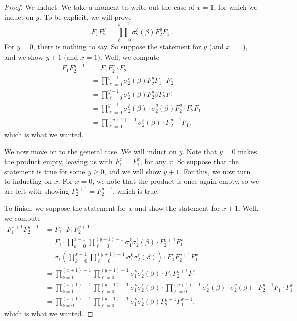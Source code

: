 \documentclass{article}
\numberwithin{equation}{section}
\begin{document}
\begin{proof}
	We induct. We take a moment to write out the case of $x=1$, for which we induct on $y$. To be explicit, we will prove
	\[F_1F_2^y=\prod_{\ell=0}^{y-1}\sigma_2^\ell(\beta)F_2^yF_1.\]
	For $y=0$, there is nothing to say. So suppose the statement for $y$ (and $x=1$), and we show $y+1$ (and $x=1$). Well, we compute
	\begin{align*}
		F_1F_2^{y+1} &= F_1F_2^y\cdot F_2 \\
		&= \prod_{\ell=0}^{y-1}\sigma_2^\ell(\beta)F_2^yF_1\cdot F_2 \\
		&= \prod_{\ell=0}^{y-1}\sigma_2^\ell(\beta)F_2^y\beta F_2F_1 \\
		&= \prod_{\ell=0}^{y-1}\sigma_2^\ell(\beta)\cdot \sigma_2^y(\beta)F_2^y\cdot F_2F_1 \\
		&= \prod_{\ell=0}^{(y+1)-1}\sigma_2^\ell(\beta)\cdot F_2^{y+1}F_1,
	\end{align*}
	which is what we wanted.
	
	We now move on to the general case. We will induct on $y$. Note that $y=0$ makes the product empty, leaving us with $F_1^x=F_1^x$, for any $x$. So suppose that the statement is true for some $y\ge0$, and we will show $y+1$. For this, we now turn to inducting on $x$. For $x=0$, we note that the product is once again empty, so we are left with showing $F_2^{y+1}=F_2^{y+1}$, which is true.
	
	To finish, we suppose the statement for $x$ and show the statement for $x+1$. Well, we compute
	\begin{align*}
		F_1^{x+1}F_2^{y+1} &= F_1\cdot F_1^xF_2^{y+1} \\
		&= F_1\cdot \prod_{k=0}^{x-1}\prod_{\ell=0}^{(y+1)-1}\sigma_1^k\sigma_2^\ell(\beta)\cdot F_2^{y+1}F_1^x \\
		&= \sigma_1\left(\prod_{k=0}^{x-1}\prod_{\ell=0}^{(y+1)-1}\sigma_1^k\sigma_2^\ell(\beta)\right)\cdot F_1F_2^{y+1}F_1^x \\
		&= \prod_{k=1}^{(x+1)-1}\prod_{\ell=0}^{(y+1)-1}\sigma_1^k\sigma_2^\ell(\beta)\cdot F_1F_2^{y+1}F_1^x \\
		&= \prod_{k=1}^{(x+1)-1}\prod_{\ell=0}^{(y+1)-1}\sigma_1^k\sigma_2^\ell(\beta)\cdot \prod_{\ell=0}^{(y+1)-1}\sigma_2^\ell(\beta)\cdot \sigma_2^y(\beta)\cdot F_2^{y+1}F_1\cdot F_1^x \\
		&= \prod_{k=0}^{(x+1)-1}\prod_{\ell=0}^{(y+1)-1}\sigma_1^k\sigma_2^\ell(\beta)F_2^{y+1}F_1^{x+1},
	\end{align*}
	which is what we wanted.
\end{proof}
\end{document}

